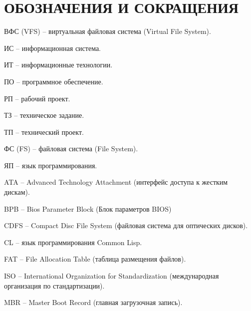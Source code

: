 \section*{ОБОЗНАЧЕНИЯ И СОКРАЩЕНИЯ}

ВФС (VFS) -- виртуальная файловая система (Virtual File System).

ИС -- информационная система.

ИТ -- информационные технологии. 

ПО -- программное обеспечение.

РП -- рабочий проект.

ТЗ -- техническое задание.

ТП -- технический проект.

ФС (FS) -- файловая система (File System).

ЯП -- язык программирования.

ATA -- Advanced Technology Attachment (интерфейс доступа к жестким дискам).

BPB -- Bios Parameter Block (Блок параметров BIOS)

CDFS -- Compact Disc File System (файловая система для оптических дисков).

CL -- язык программирования Common Lisp.

FAT -- File Allocation Table (таблица размещения файлов).

ISO -- International Organization for Standardization (международная организация по стандартизации).

MBR -- Master Boot Record (главная загрузочная запись).